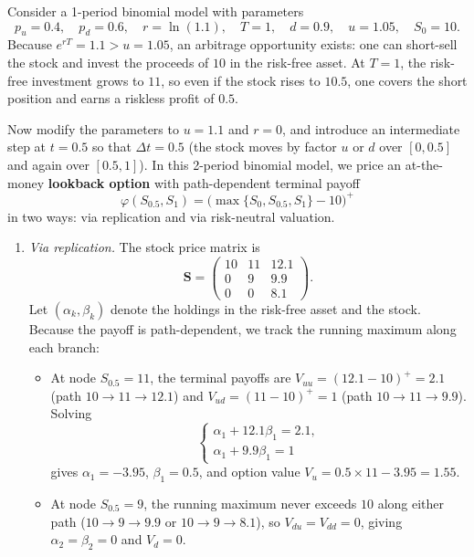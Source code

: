 \begin{example}
Consider a 1-period binomial model with parameters
\[
    p_u = 0.4, \quad p_d = 0.6, \quad r = \ln(1.1), \quad T = 1, \quad d = 0.9, \quad u = 1.05, \quad S_0 = 10.
\]
Because $e^{rT} = 1.1 > u = 1.05$, an arbitrage opportunity exists: one can short-sell the stock and invest the proceeds of $10$ in the risk-free asset. At $T = 1$, the risk-free investment grows to $11$, so even if the stock rises to $10.5$, one covers the short position and earns a riskless profit of $0.5$.

Now modify the parameters to $u = 1.1$ and $r = 0$, and introduce an intermediate step at $t = 0.5$ so that $\Delta t = 0.5$ (the stock moves by factor $u$ or $d$ over $[0, 0.5]$ and again over $[0.5, 1]$). In this 2-period binomial model, we price an at-the-money \textbf{lookback option} with path-dependent terminal payoff
\[
    \varphi(S_{0.5}, S_1) = \bigl(\max\{S_0, S_{0.5}, S_1\} - 10\bigr)^+
\]
in two ways: via replication and via risk-neutral valuation.
\begin{enumerate}
    \item \emph{Via replication.} The stock price matrix is
    \[
        \mathbf{S} =
        \begin{pmatrix}
            10 & 11 & 12.1 \\
            0 & 9 & 9.9 \\
            0 & 0 & 8.1
        \end{pmatrix}.
    \]
    Let $(\alpha_k, \beta_k)$ denote the holdings in the risk-free asset and the stock. Because the payoff is path-dependent, we track the running maximum along each branch:
    \begin{itemize}
        \item At node $S_{0.5} = 11$, the terminal payoffs are $V_{uu} = (12.1 - 10)^+ = 2.1$ (path $10 \to 11 \to 12.1$) and $V_{ud} = (11 - 10)^+ = 1$ (path $10 \to 11 \to 9.9$). Solving
        \[
            \begin{cases}
                \alpha_1 + 12.1 \beta_1 = 2.1, \\
                \alpha_1 + 9.9 \beta_1 = 1
            \end{cases}
        \]
        gives $\alpha_1 = -3.95$, $\beta_1 = 0.5$, and option value $V_u = 0.5 \times 11 - 3.95 = 1.55$.
        \item At node $S_{0.5} = 9$, the running maximum never exceeds $10$ along either path ($10 \to 9 \to 9.9$ or $10 \to 9 \to 8.1$), so $V_{du} = V_{dd} = 0$, giving $\alpha_2 = \beta_2 = 0$ and $V_d = 0$.

\end{itemize}
\end{enumerate}
\end{example}
